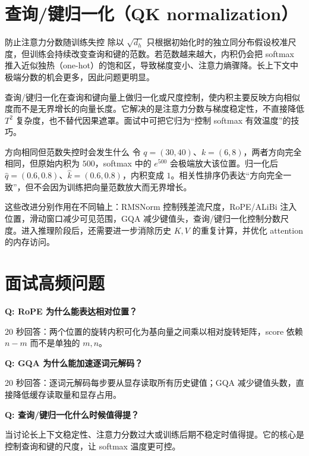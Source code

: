 \section{查询/键归一化（QK normalization）}

\begin{motivationbox}{防止注意力分数随训练失控}
除以 $\sqrt{d_h}$ 只根据初始化时的独立同分布假设校准尺度，但训练会持续改变查询和键的范数。若范数越来越大，内积仍会把 softmax 推入近似独热（one-hot）的饱和区，导致梯度变小、注意力熵骤降。长上下文中极端分数的机会更多，因此问题更明显。
\end{motivationbox}

查询/键归一化在查询和键向量上做归一化或尺度控制，使内积主要反映方向相似度而不是无界增长的向量长度。它解决的是注意力分数与梯度稳定性，不直接降低 $T^2$ 复杂度，也不替代因果遮罩。面试中可把它归为“控制 softmax 有效温度”的技巧。

\begin{examplebox}{方向相同但范数失控时会发生什么}
令 $q=(30,40)$、$k=(6,8)$，两者方向完全相同，但原始内积为 $500$，softmax 中的 $e^{500}$ 会极端放大该位置。归一化后 $\hat q=(0.6,0.8)$、$\hat k=(0.6,0.8)$，内积变成 $1$。相关性排序仍表达“方向完全一致”，但不会因为训练把向量范数放大而无界增长。
\end{examplebox}

这些改进分别作用在不同轴上：RMSNorm 控制残差流尺度，RoPE/ALiBi 注入位置，滑动窗口减少可见范围，GQA 减少键值头，查询/键归一化控制分数尺度。进入推理阶段后，还需要进一步消除历史 $K,V$ 的重复计算，并优化 attention 的内存访问。

\section*{面试高频问题}

\textbf{Q: RoPE 为什么能表达相对位置？}

20 秒回答：两个位置的旋转内积可化为基向量之间乘以相对旋转矩阵，score 依赖 $n-m$ 而不是单独的 $m,n$。

\textbf{Q: GQA 为什么能加速逐词元解码？}

20 秒回答：逐词元解码每步要从显存读取所有历史键值；GQA 减少键值头数，直接降低缓存读取量和显存占用。

\textbf{Q: 查询/键归一化什么时候值得提？}

当讨论长上下文稳定性、注意力分数过大或训练后期不稳定时值得提。它的核心是控制查询和键的尺度，让 softmax 温度更可控。
